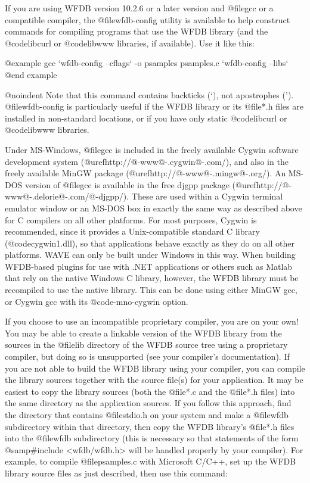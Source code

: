 {{If you are using WFDB version 10.2.6 or a later version and @file{gcc}
or a compatible compiler, the @file{wfdb-config} utility is available
to help construct commands for compiling programs that use the WFDB
library (and the @code{libcurl} or @code{libwww} libraries, if available).
Use it like this:

@example
gcc `wfdb-config --cflags` -o psamples psamples.c `wfdb-config --libs`
@end example

@noindent
Note that this command contains backticks (`), not apostrophes (').
@file{wfdb-config} is particularly useful if the WFDB library or
its @file{*.h} files are installed in non-standard locations, or if
you have only static @code{libcurl} or @code{libwww} libraries.

Under MS-Windows, @file{gcc} is included in the freely available Cygwin
software development system (@uref{http://@-www@-.cygwin@-.com/}), and also in
the freely available MinGW package (@uref{http://@-www@-.mingw@-.org/}).  An
MS-DOS version of @file{gcc} is available in the free djgpp package
(@uref{http://@-www@-.delorie@-.com/@-djgpp/}). These are used within a Cygwin
terminal emulator window or an MS-DOS box in exactly the same way as described
above for C compilers on all other platforms.  For most purposes, Cygwin is
recommended, since it provides a Unix-compatible standard C library
(@code{cygwin1.dll}), so that applications behave exactly as they do on all
other platforms.  WAVE can only be built under Windows in this way.  When
building WFDB-based plugins for use with .NET applications or others such as
Matlab that rely on the native Windows C library, however, the WFDB library
must be recompiled to use the native library.  This can be done using either
MinGW gcc, or Cygwin gcc with its @code{-mno-cygwin} option.

If you choose to use an incompatible proprietary compiler, you are on
your own!  You may be able to create a linkable version of the WFDB
library from the sources in the @file{lib} directory of the WFDB source
tree using a proprietary compiler, but doing so is unsupported (see your
compiler's documentation).  If you are not able to build the WFDB
library using your compiler, you can compile the library sources
together with the source file(s) for your application.  It may be
easiest to copy the library sources (both the @file{*.c} and the
@file{*.h} files) into the same directory as the application sources.
If you follow this approach, find the directory that contains @file{stdio.h}
on your system and make a @file{wfdb} subdirectory within that directory,
then copy the WFDB library's @file{*.h} files into the @file{wfdb}
subdirectory (this is necessary so that statements of the form
@samp{#include <wfdb/wfdb.h>} will be handled properly by your compiler).
For example, to compile @file{psamples.c} with Microsoft C/C++, set up
the WFDB library source files as just described, then use this command:

}}

